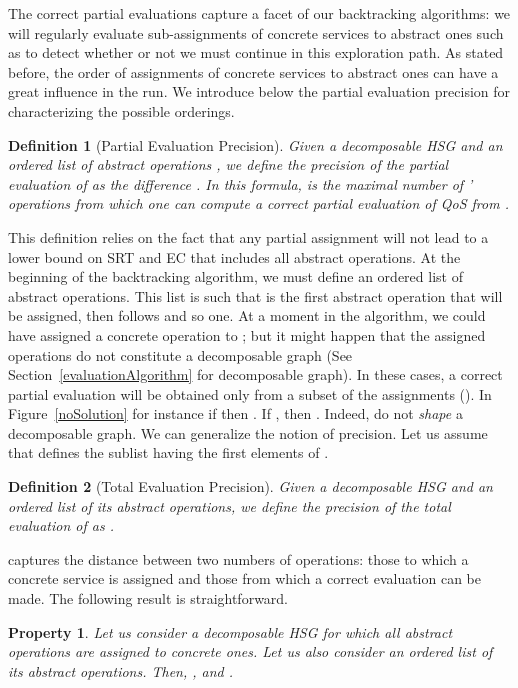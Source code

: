 \documentclass[a4paper]{article}
\newtheorem{definition}{Definition}
\newtheorem{property}{Property}
\begin{document}
The correct partial evaluations capture a facet of our backtracking algorithms: we will regularly evaluate sub-assignments 
of concrete services to abstract ones such as to detect whether or not we must continue in this exploration 
path. As stated before, the order of assignments of concrete services to abstract ones can have a great 
influence in the run. We introduce below the partial evaluation precision for characterizing the possible orderings. 

\begin{definition}[Partial Evaluation Precision]
Given a decomposable HSG  and an ordered list of abstract operations , 
we define the precision of the partial evaluation of  as the difference . 
In this formula,  is the maximal number of ' operations from which one can compute a correct 
partial evaluation of QoS from . 
\end{definition}

This definition relies on the fact that any partial assignment will not lead to a lower bound 
on SRT and EC that includes all abstract operations. At the beginning of the backtracking algorithm, we must define 
an ordered list  of abstract operations. This list is such that  is the first abstract operation that will be 
assigned, then follows   and so one. At a moment in the algorithm, we could have assigned a concrete 
operation to ; but it might happen that the assigned operations do not 
constitute a decomposable graph (See Section~\ref{evaluationAlgorithm} for decomposable graph). 
In these cases, a correct partial evaluation will be obtained only 
from a subset of the assignments (). In Figure~\ref{noSolution} for instance if  
then . If , then . Indeed,  do not {\it shape} a decomposable 
graph. 
We can generalize the notion of precision.
Let us assume that  defines the sublist having the first  elements of .  

\begin{definition}[Total Evaluation Precision]
Given a decomposable HSG  and an ordered list  of its abstract operations, 
we define the precision of the total evaluation of  as .
\end{definition}
 captures the distance between two numbers of operations: those to 
which a concrete service is assigned and those from which a correct evaluation can be made. The following 
result is straightforward.

\begin{property}
Let us consider a decomposable HSG for which all abstract operations are assigned to 
concrete ones. Let us also consider an ordered list  of its abstract operations. Then,  
,   and  . 
\end{property}
\end{document}
